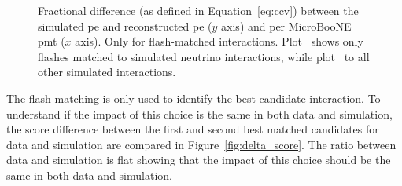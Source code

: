 \begin{figure}[]
\centering
{} 
\caption[PMT PE Fraction Difference in Simulation]{Fractional difference (as defined in Equation~\ref{eq:ccv}) between the simulated \acrshort{pe} and reconstructed \acrshort{pe} ($y$ axis) and per MicroBooNE \acrshort{pmt} ($x$ axis). Only for flash-matched interactions. Plot~\protect{} shows only flashes matched to simulated neutrino interactions, while plot~\protect{} to all other simulated interactions.}
\label{fig:ccv_mc}
\end{figure}

The flash matching is only used to identify the best candidate interaction. To understand if the impact of this choice is the same in both data and simulation, the score difference between the first and second best matched candidates for data and simulation are compared in Figure~\ref{fig:delta_score}. The ratio between data and simulation is flat showing that the impact of this choice should be the same in both data and simulation.

